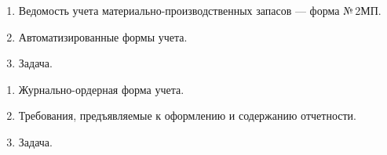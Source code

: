 \newpage


\shapkFull
\setcounter{zad}{0}

\begin{enumerate}
	\item Ведомость учета материально-производственных запасов --- форма №\,2МП.

	\item Автоматизированные формы учета.

	\item Задача.
\end{enumerate}

\newpage


\shapkFull
\setcounter{zad}{0}

\begin{enumerate}
	\item Журнально-ордерная форма учета.

	\item Требования, предъявляемые к оформлению и содержанию отчетности.
	\item Задача.
\end{enumerate}

\newpage